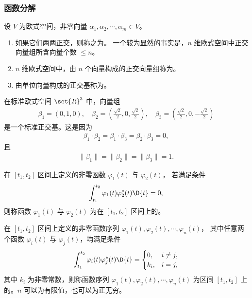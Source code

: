 \subsubsection{函数分解}

\begin{definition}[正交基]
    设 $V$ 为欧式空间，非零向量 $\alpha_1, \alpha_2, \cdots, \alpha_m \in V$。
    \begin{enumerate}
        \item 如果它们两两正交，则称之为。
            一个较为显然的事实是，$n$ 维欧式空间中正交向量组所含向量个数 $\le n$。
        \item $n$ 维欧式空间中，由 $n$ 个向量构成的正交向量组称为。
        \item 由单位向量构成的正交基称为。
    \end{enumerate}
\end{definition}

\begin{example}
    在标准欧式空间 $\set{R}^3$ 中，向量组
    \begin{align*}
        \beta_1 = (0, 1, 0),
        \quad \beta_2 = (\frac{\sqrt{2}}{2}, 0, \frac{\sqrt{2}}{2}),
        \quad \beta_3 = (\frac{\sqrt{2}}{2}, 0, -\frac{\sqrt{2}}{2})
    \end{align*}
    是一个标准正交基。这是因为
    \begin{align*}
        \beta_1 \cdot \beta_2 = \beta_1 \cdot \beta_3 = \beta_2 \cdot \beta_3 = 0,
    \end{align*}
    且
    \begin{align*}
        \|\beta_1\| = \|\beta_2\| = \|\beta_3\| = 1.
    \end{align*}
\end{example}

\begin{definition}[正交函数与正交函数集]
    在 $[t_1, t_2]$ 区间上定义的非零函数 $\varphi_1(t)$ 与 $\varphi_2(t)$，
    若满足条件
    \begin{align*}
        \int_{t_1}^{t_2}\varphi_1(t)\varphi_2^*(t)\D{t} = 0,
    \end{align*}
    则称函数 $\varphi_1(t)$ 与 $\varphi_2(t)$ 为在 $[t_1, t_2]$ 区间上的。

    在 $[t_1, t_2]$ 区间上定义的非零函数序列 $\varphi_1(t), \varphi_2(t), \cdots, \varphi_n(t)$，
    其中任意两个函数 $\varphi_i(t)$ 与 $\varphi_j(t)$，均满足条件
    \begin{align*}
        \int_{t_1}^{t_2}\varphi_i(t)\varphi_j^*(t)\D{t} = \begin{cases}
            0, & i \ne j, \\
            k_i, & i = j,
        \end{cases}
    \end{align*}
    其中 $k_i$ 为非零常数，则称函数序列 $\varphi_1(t), \varphi_2(t), \cdots, \varphi_n(t)$
    为区间 $[t_1, t_2]$ 上的。$n$ 可以为有限值，也可以为正无穷。
\end{definition}

